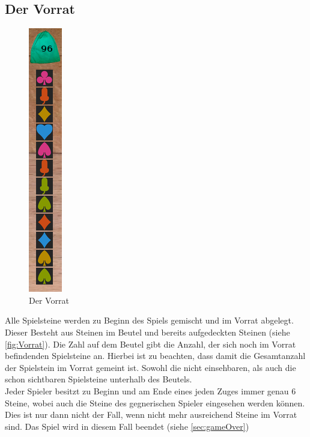\documentclass[a4paper, ngerman]{scrartcl}
\begin{document}
\subsection{Der Vorrat}
\begin{figure}
	\centering
	\includegraphics[scale = 0.5]{images/Vorratsbeutel}
	\caption{Der Vorrat}
	\label{fig:Vorrat}
\end{figure}
 Alle Spielsteine werden zu Beginn des Spiels gemischt und im Vorrat abgelegt. Dieser Besteht aus Steinen im Beutel und bereits aufgedeckten Steinen (siehe \autoref{fig:Vorrat}). Die Zahl auf dem Beutel gibt die Anzahl, der sich noch im Vorrat befindenden Spielsteine an. Hierbei ist zu beachten, dass damit die Gesamtanzahl der Spielstein im Vorrat gemeint ist. Sowohl die nicht einsehbaren, als auch die schon sichtbaren Spielsteine unterhalb des Beutels.\\
Jeder Spieler besitzt zu Beginn und am Ende eines jeden Zuges immer genau 6 Steine, wobei auch die Steine des gegnerischen Spieler eingesehen werden können. Dies ist nur dann nicht der Fall, wenn nicht mehr ausreichend Steine im Vorrat sind. Das Spiel wird in diesem Fall beendet (siehe \autoref{sec:gameOver})\\
\newpage
\end{document}
